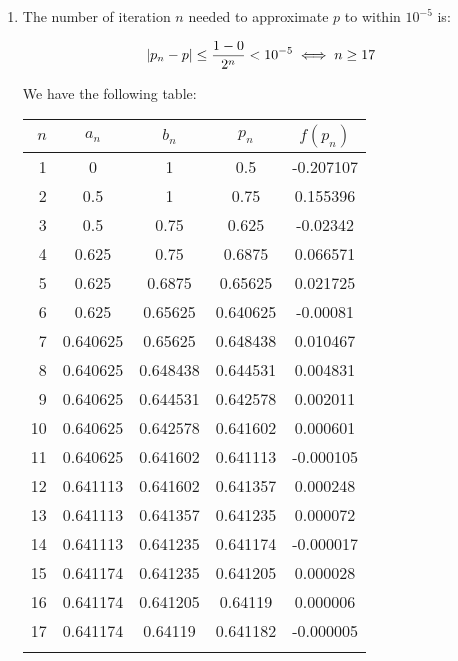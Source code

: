 \documentclass[../../Assignments.tex]{subfiles}
\begin{document}
\begin{solution}
    \begin{enumerate}[label=(\alph*)]
        \item The number of iteration \(n\) needed to approximate \(p\) to
            within \(10^{-5}\) is:

            \[\abs{p_n - p} \leq \frac{1 - 0}{2^n} < 10^{-5} \iff n \geq 17\]

            We have the following table:

            \begin{tabular}{r S[table-format=-1.6] S[table-format=-1.5] S[table-format=-1.6] S[table-format=-1.6]}
                \\
                \toprule
                \(n\)  &  {\(a_n\)}  &  {\(b_n\)}  &  {\(p_n\)}  &  {\(f(p_n)\)} \\
                  &  0          &  1          &  0.5        &  -0.207107    \\
                    2  &  0.5        &  1          &  0.75       &   0.155396    \\
                    3  &  0.5        &  0.75       &  0.625      &  -0.02342     \\
                    4  &  0.625      &  0.75       &  0.6875     &   0.066571    \\
                    5  &  0.625      &  0.6875     &  0.65625    &   0.021725    \\
                    6  &  0.625      &  0.65625    &  0.640625   &  -0.00081     \\
                    7  &  0.640625   &  0.65625    &  0.648438   &   0.010467    \\
                    8  &  0.640625   &  0.648438   &  0.644531   &   0.004831    \\
                    9  &  0.640625   &  0.644531   &  0.642578   &   0.002011    \\
                   10  &  0.640625   &  0.642578   &  0.641602   &   0.000601    \\
                   11  &  0.640625   &  0.641602   &  0.641113   &  -0.000105    \\
                   12  &  0.641113   &  0.641602   &  0.641357   &   0.000248    \\
                   13  &  0.641113   &  0.641357   &  0.641235   &   0.000072    \\
                   14  &  0.641113   &  0.641235   &  0.641174   &  -0.000017    \\
                   15  &  0.641174   &  0.641235   &  0.641205   &   0.000028    \\
                   16  &  0.641174   &  0.641205   &  0.64119    &   0.000006    \\
                   17  &  0.641174   &  0.64119    &  0.641182   &  -0.000005    \\
                \bottomrule
                \\
            \end{tabular}


\end{enumerate}
\end{solution}
\end{document}
